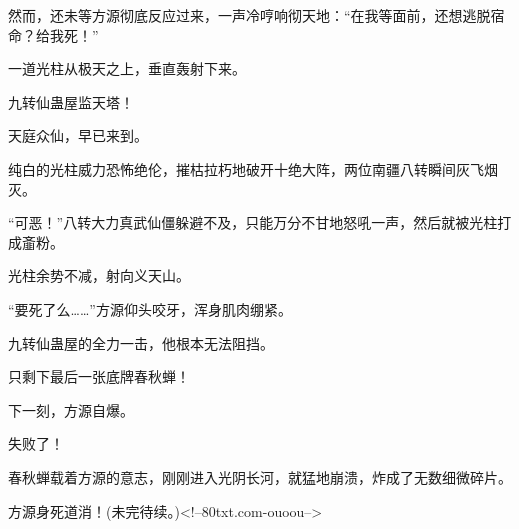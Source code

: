 \begin{this_body}
然而，还未等方源彻底反应过来，一声冷哼响彻天地：“在我等面前，还想逃脱宿命？给我死！”

一道光柱从极天之上，垂直轰射下来。

九转仙蛊屋监天塔！

天庭众仙，早已来到。

纯白的光柱威力恐怖绝伦，摧枯拉朽地破开十绝大阵，两位南疆八转瞬间灰飞烟灭。

“可恶！”八转大力真武仙僵躲避不及，只能万分不甘地怒吼一声，然后就被光柱打成齑粉。

光柱余势不减，射向义天山。

“要死了么……”方源仰头咬牙，浑身肌肉绷紧。

九转仙蛊屋的全力一击，他根本无法阻挡。

只剩下最后一张底牌春秋蝉！

下一刻，方源自爆。

失败了！

春秋蝉载着方源的意志，刚刚进入光阴长河，就猛地崩溃，炸成了无数细微碎片。

方源身死道消！(未完待续。)<!--80txt.com-ouoou-->

\end{this_body}


